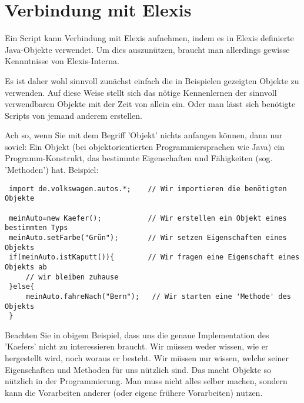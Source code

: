 \documentclass[a4paper]{scrartcl}
\begin{document}
\section{Verbindung mit Elexis}
Ein Script kann Verbindung mit Elexis aufnehmen, indem es in Elexis definierte Java-Objekte
verwendet. Um dies auszunützen, braucht man allerdings gewisse Kennntnisse von Elexis-Interna.

Es ist daher wohl sinnvoll zunächst einfach die in Beispielen gezeigten Objekte zu verwenden.
Auf diese Weise stellt sich das nötige Kennenlernen der sinnvoll verwendbaren Objekte mit der
Zeit von allein ein. Oder man lässt sich benötigte Scripts von jemand anderem erstellen.

\medskip

Ach so, wenn Sie mit dem Begriff 'Objekt' nichts anfangen können, dann nur soviel: Ein Objekt (bei objektorientierten Programmiersprachen wie Java) ein Programm-Konstrukt, das bestimmte Eigenschaften und Fähigkeiten (sog. 'Methoden') hat. Beispiel:
\begin{small}
\begin{verbatim}
 import de.volkswagen.autos.*;    // Wir importieren die benötigten Objekte
    
 meinAuto=new Kaefer();           // Wir erstellen ein Objekt eines bestimmten Typs
 meinAuto.setFarbe("Grün");       // Wir setzen Eigenschaften eines Objekts
 if(meinAuto.istKaputt()){        // Wir fragen eine Eigenschaft eines Objekts ab
     // wir bleiben zuhause
 }else{
     meinAuto.fahreNach("Bern");   // Wir starten eine 'Methode' des Objekts
 }

\end{verbatim}
\end{small}

Beachten Sie in obigem Beispiel, dass uns die genaue Implementation des 'Kaefers' nicht zu interessieren braucht. Wir müssen weder wissen, wie er hergestellt wird, noch woraus er besteht. Wir müssen nur wissen, welche seiner Eigenschaften und Methoden für uns nützlich sind.
Das macht Objekte so nützlich in der Programmierung. Man muss nicht alles selber machen, sondern
kann die Vorarbeiten anderer (oder eigene frühere Vorarbeiten) nutzen.
\end{document}
